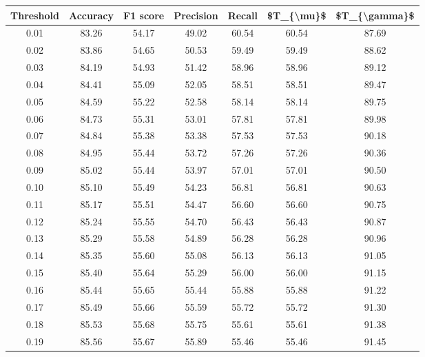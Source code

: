 \begin{tabular}{|c|c|c|c|c|c|c|}
\hline
 Threshold &  Accuracy &  F1 score &  Precision &  Recall &  \$T\_\{\textbackslash mu\}\$ &  \$T\_\{\textbackslash gamma\}\$ \\
\hline
      0.01 &     83.26 &     54.17 &      49.02 &   60.54 &      60.54 &         87.69 \\
      0.02 &     83.86 &     54.65 &      50.53 &   59.49 &      59.49 &         88.62 \\
      0.03 &     84.19 &     54.93 &      51.42 &   58.96 &      58.96 &         89.12 \\
      0.04 &     84.41 &     55.09 &      52.05 &   58.51 &      58.51 &         89.47 \\
      0.05 &     84.59 &     55.22 &      52.58 &   58.14 &      58.14 &         89.75 \\
      0.06 &     84.73 &     55.31 &      53.01 &   57.81 &      57.81 &         89.98 \\
      0.07 &     84.84 &     55.38 &      53.38 &   57.53 &      57.53 &         90.18 \\
      0.08 &     84.95 &     55.44 &      53.72 &   57.26 &      57.26 &         90.36 \\
      0.09 &     85.02 &     55.44 &      53.97 &   57.01 &      57.01 &         90.50 \\
      0.10 &     85.10 &     55.49 &      54.23 &   56.81 &      56.81 &         90.63 \\
      0.11 &     85.17 &     55.51 &      54.47 &   56.60 &      56.60 &         90.75 \\
      0.12 &     85.24 &     55.55 &      54.70 &   56.43 &      56.43 &         90.87 \\
      0.13 &     85.29 &     55.58 &      54.89 &   56.28 &      56.28 &         90.96 \\
      0.14 &     85.35 &     55.60 &      55.08 &   56.13 &      56.13 &         91.05 \\
      0.15 &     85.40 &     55.64 &      55.29 &   56.00 &      56.00 &         91.15 \\
      0.16 &     85.44 &     55.65 &      55.44 &   55.88 &      55.88 &         91.22 \\
      0.17 &     85.49 &     55.66 &      55.59 &   55.72 &      55.72 &         91.30 \\
      0.18 &     85.53 &     55.68 &      55.75 &   55.61 &      55.61 &         91.38 \\
      0.19 &     85.56 &     55.67 &      55.89 &   55.46 &      55.46 &         91.45 \\

\end{tabular}
